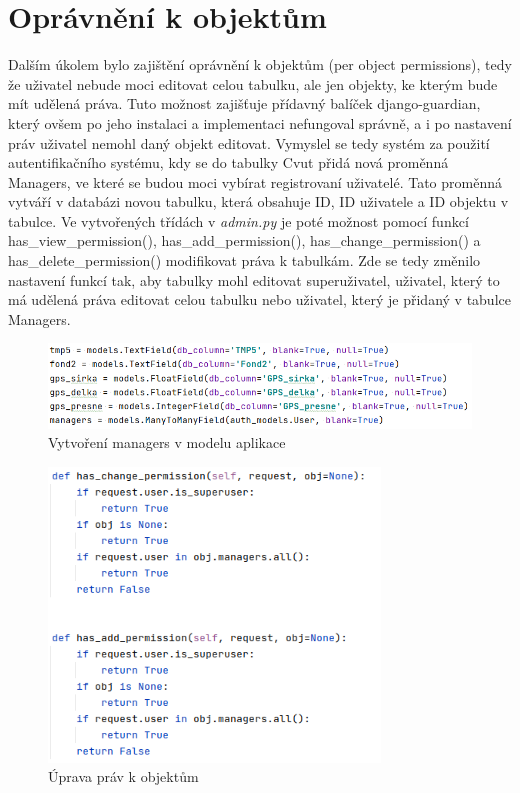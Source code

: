 \section{Oprávnění k objektům}
\label{pop}
Dalším úkolem bylo zajištění oprávnění k objektům (per object permissions), tedy že uživatel nebude moci editovat celou tabulku, ale jen objekty, ke kterým bude mít udělená práva. Tuto možnost zajišťuje přídavný balíček django-guardian, který ovšem po jeho instalaci a implementaci nefungoval správně, a i po nastavení práv uživatel nemohl daný objekt editovat. Vymyslel se tedy systém za použití autentifikačního systému, kdy se do tabulky Cvut přidá nová proměnná Managers, ve které se budou moci vybírat registrovaní uživatelé. Tato proměnná vytváří v databázi novou tabulku, která obsahuje ID, ID uživatele a ID objektu v tabulce. Ve vytvořených třídách v \emph{admin.py} je poté možnost pomocí funkcí has\_view\_permission(), has\_add\_permission(), has\_change\_permission() a has\_delete\_permission() modifikovat práva k tabulkám. Zde se tedy změnilo nastavení funkcí tak, aby tabulky mohl editovat superuživatel, uživatel, který to má udělená práva editovat celou tabulku nebo uživatel, který je přidaný v tabulce Managers. 

\begin{figure}[H] \centering
    \includegraphics[width=330pt]{./pictures/11-managers-model.PNG}
    \caption[Vytvoření managers v modelu aplikace]{Vytvoření managers v modelu aplikace}
	\label{fig:Vytvoření managers v modelu aplikace}              
\end{figure}

\begin{figure}[H] \centering
    \includegraphics[width=250pt]{./pictures/14-object-permissions.PNG}
    \caption[Úprava práv k objektům]{Úprava práv k objektům}
	\label{fig:Úprava práv k objektům}              
\end{figure}



